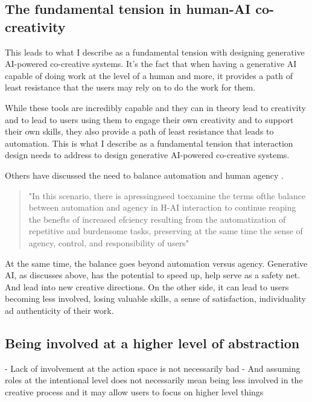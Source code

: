 \subsection{The fundamental tension in human-AI co-creativity}

This leads to what I describe as a fundamental tension with designing generative AI-powered co-creative systems. It's the fact that when having a generative AI capable of doing work at the level of a human and more, it provides a path of least resistance that the users may rely on to do the work for them.

While these tools are incredibly capable and they can in theory lead to creativity and to lead to users using them to engage their own creativity and to support their own skills, they also provide a path of least resistance that leads to automation. This is what I describe as a fundamental tension that interaction design needs to address to design generative AI-powered co-creative systems. 



Others have discussed the need to balance automation and human agency \cite{Moruzzi2024-cq}. 

\begin{quote}
    "In this scenario, there is apressingneed toexamine the terms ofthe balance between automation and agency in H-AI interaction to continue reaping the benefts of increased efciency resulting from the automatization of repetitive and burdensome tasks, preserving at the same time the sense of agency, control, and responsibility of users"
\end{quote}

At the same time, the balance goes beyond automation versus agency. Generative AI, as discusses above, has the potential to speed up, help serve as a safety net. And lead into new creative directions. On the other side, it can lead to users becoming less involved, losing valuable skills, a sense of satisfaction, individuality ad authenticity of their work. 


\subsection{Being involved at a higher level of abstraction}


- Lack of involvement at the action space is not necessarily bad
- And assuming roles at the intentional level does not necessarily mean being less involved in the creative process and it may allow users to focus on higher level things

